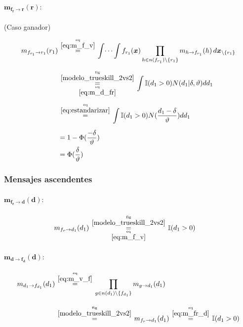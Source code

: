 \documentclass[article]{jss}
\newcommand\hfrac[2]{\genfrac{}{}{0pt}{}{#1}{#2}} %
\begin{document}
\begin{appendix}
\paragraph{$\bm{m_{f_r \rightarrow r}(r)}:$} (Caso ganador)

\begin{equation}\label{eq:m_fr_r}
\begin{split}
 m_{f_{r_1} \rightarrow r_1}(r_1) & \overset{\hfrac{\text{eq}}{\ref{eq:m_f_v}}}{=} \int \dots \int f_{r_1}(\bm{x}) \prod_{h \in n(f_{r_1}) \setminus \{r_1\} } m_{h \rightarrow f_{r_1}}(h) \, d\bm{x}_{\setminus \{r_1\} }  \\[0.2cm]
 & \overset{\hfrac{\text{fig}}{\ref{modelo_trueskill_2vs2}}}{\underset{\hfrac{\text{eq}}{\ref{eq:m_d_fr}}}{=}} \int \mathbb{I}(d_1 > 0) N(d_1 | \delta, \vartheta)  dd_1 \\[0.2cm]
 &  \overset{\hfrac{\text{eq}}{\ref{eq:estandarizar}}}{=} \int \mathbb{I}(d_1 > 0) N( \frac{d_1 - \delta}{\vartheta}) dd_1 \\[0.2cm]
 & = 1 - \Phi(\frac{-\delta}{\vartheta}) \\
 & = \Phi(\frac{\delta}{\vartheta})
\end{split}
\end{equation}













\subsubsection{Mensajes ascendentes}

\paragraph{$\bm{m_{f_r \rightarrow d}(d)}:$}

\begin{equation}\label{eq:m_fr_d}
\begin{split}
m_{f_r \rightarrow d_1}(d_1) & \overset{\hfrac{\text{fig}}{\ref{modelo_trueskill_2vs2}}}{\underset{\hfrac{\text{eq}}{\ref{eq:m_f_v}}}{=}} \mathbb{I}(d_1 > 0)
\end{split}
\end{equation}


\paragraph{$\bm{m_{d \rightarrow f_d}(d)}:$}
\begin{equation}\label{eq:m_d_fd}
\begin{split}
m_{d_1 \rightarrow f_{d_1}}(d_1) & \overset{\hfrac{\text{eq}}{\ref{eq:m_v_f}}}{=} \prod_{g \in n(d_1) \setminus  \{f_{d_1} \}} m_{g \rightarrow d_1} (d_1) \\[0.3cm]
 & \overset{\hfrac{\text{fig}}{\ref{modelo_trueskill_2vs2}}}{=} m_{f_r \rightarrow d_1}(d_1) \overset{\hfrac{\text{eq}}{\ref{eq:m_fr_d}}}{=} \mathbb{I}(d_1 > 0)
\end{split}
\end{equation}


\end{appendix}
\end{document}
